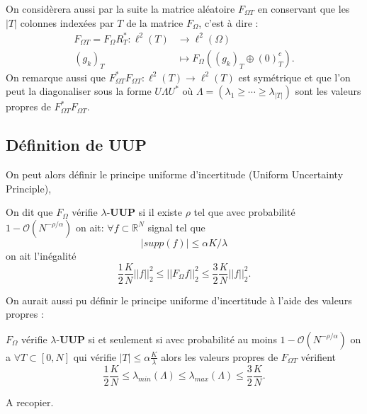 On considèrera aussi par la suite la matrice aléatoire $F_{\Omega T}$ en conservant que les $|T|$ colonnes indexées par $T$ de la matrice $F_{\Omega}$, c'est à dire :
\begin{align}
	F_{\Omega T} = F_{\Omega} R_T^* : \ell^2(T) &\longrightarrow \ell^2(\Omega)\\
		(g_k)_T &\longmapsto F_{\Omega}( (g_k)_T \oplus (0)_T^c ).
\end{align}
On remarque aussi que $F_{\Omega T}^* F_{\Omega T} : \ell^2(T) \rightarrow \ell^2(T)$ est symétrique et que l'on peut la diagonaliser sous la forme $U \Lambda U^*$ où $\Lambda = (\lambda_1 \geq \cdots \geq \lambda_{|T|})$ sont les valeurs propres de $F_{\Omega T}^* F_{\Omega T}$.
\subsection{Définition de \textbf{UUP}} 
On peut alors définir le principe uniforme d'incertitude (Uniform Uncertainty Principle), 
\begin{definition}
	On dit que $F_\Omega$ vérifie $\lambda$-\textbf{UUP} si il existe $\rho$ tel que avec probabilité $1 - \mathcal{O}(N^{-\rho / \alpha})$ on ait:
	\newline
	$\forall f \subset \mathbb{R}^N$ signal tel que 
	\begin{equation}\label{eq:UUP1}
		|supp(f)| \leq \alpha K /\lambda
	\end{equation}
	on ait l'inégalité
	\begin{equation}\label{eq:UUP2}
		\frac{1}{2}\frac{K}{N} ||f||_2^2\leq ||F_\Omega f||_2^2 \leq \frac{3}{2} \frac{K}{N} ||f||_2^2.
	\end{equation}
\end{definition}
On aurait aussi pu définir le principe uniforme d'incertitude à l'aide des valeurs propres :
\begin{proposition}
	$F_\Omega$ vérifie $\lambda$-\textbf{UUP} si et seulement si 
	\newline
	avec probabilité au moins $1-\mathcal{O}(N^{-\rho / \alpha})$ on a
	$\forall T \subset [0, N]$ qui vérifie $|T| \leq \alpha \frac{K}{\lambda}$ alors les valeurs propres de $F_{\Omega T}$ vérifient
	\begin{equation*}
		\frac{1}{2} \frac{K}{N} \leq \lambda_{min}(\Lambda) \leq \lambda_{max}(\Lambda) \leq \frac{3}{2}\frac{K}{N}.
	\end{equation*}
\end{proposition}
\begin{preuve}
A recopier.
\end{preuve}
